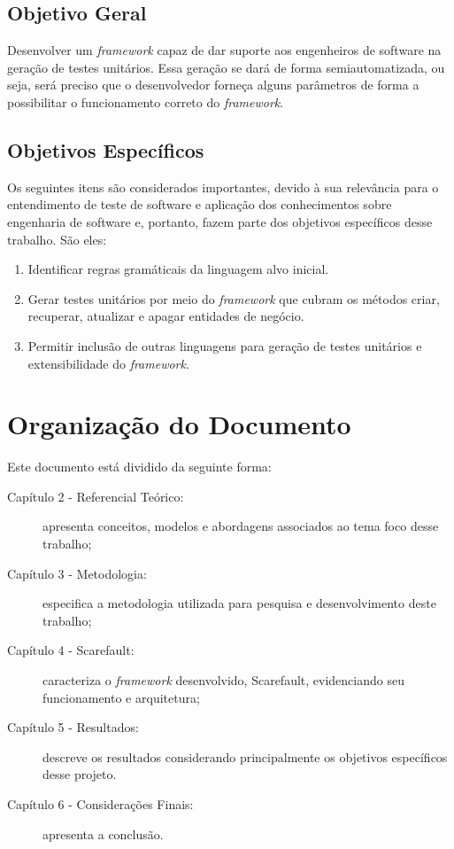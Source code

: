 \subsection{Objetivo Geral}
Desenvolver um \textit{framework} capaz de dar suporte aos engenheiros de
software na geração de testes unitários.  Essa geração se dará de forma
semiautomatizada, ou seja, será preciso que o desenvolvedor forneça alguns
parâmetros de forma a possibilitar o funcionamento correto do
\textit{framework}.

\subsection{Objetivos Específicos} \label{objspec}
Os seguintes itens são considerados importantes, devido à sua relevância para o
entendimento de teste de software e aplicação dos conhecimentos sobre
engenharia de software e, portanto, fazem parte dos objetivos específicos desse
trabalho. São eles:
\begin{enumerate}
\item Identificar regras gramáticais da linguagem alvo inicial.
\item Gerar testes unitários por meio do \textit{framework} que cubram
os métodos criar, recuperar, atualizar e apagar entidades de negócio.
\item Permitir inclusão de outras linguagens para geração de testes
unitários e extensibilidade do \textit{framework}.
\end{enumerate}

\section{Organização do Documento}
  Este documento está dividido da seguinte forma:

\begin{description}
  \item[Capítulo 2 - Referencial Teórico:] apresenta conceitos, modelos e
    abordagens associados ao tema foco desse trabalho;

  \item[Capítulo 3 - Metodologia:] especifica a metodologia utilizada para
    pesquisa e desenvolvimento deste trabalho;

  \item[Capítulo 4 - Scarefault:] caracteriza o \textit{framework} desenvolvido, Scarefault, evidenciando seu funcionamento e arquitetura;

  \item[Capítulo 5 - Resultados:] descreve os resultados considerando principalmente os objetivos específicos desse projeto.
  
  \item[Capítulo 6 - Considerações Finais:] apresenta a conclusão.
\end{description}
